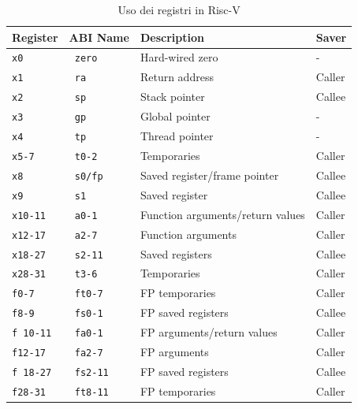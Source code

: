 \begin{table}[H]
	\begin{center}
		\begin{tabular}{|l|l|l|l|}
			\hline
			Register       & ABI Name       & Description                      & Saver  \\
			\hline
			\verb|x0|      & \verb| zero|   & Hard-wired zero                  & -      \\
			\verb|x1|      & \verb| ra|     & Return address                   & Caller \\
			\verb|x2|      & \verb| sp|     & Stack pointer                    & Callee \\
			\verb|x3|      & \verb| gp|     & Global pointer                   & -      \\
			\verb|x4|      & \verb| tp|     & Thread pointer                   & -      \\
			\verb|x5-7|    & \verb| t0-2|   & Temporaries                      & Caller \\
			\verb|x8|      & \verb| s0/fp|  & Saved register/frame pointer     & Callee \\
			\verb|x9|      & \verb| s1|     & Saved register                   & Callee \\
			\verb|x10-11|  & \verb| a0-1|   & Function arguments/return values & Caller \\
			\verb|x12-17|  & \verb| a2-7|   & Function arguments               & Caller \\
			\verb|x18-27|  & \verb| s2-11|  & Saved registers                  & Callee \\
			\verb|x28-31|  & \verb| t3-6|   & Temporaries                      & Caller \\
			\hline
			\verb|f0-7|    & \verb| ft0-7|  & FP temporaries                   & Caller \\
			\verb|f8-9|    & \verb| fs0-1|  & FP saved registers               & Callee \\
			\verb|f 10-11| & \verb| fa0-1|  & FP arguments/return values       & Caller \\
			\verb|f12-17|  & \verb| fa2-7|  & FP arguments                     & Caller \\
			\verb|f 18-27| & \verb| fs2-11| & FP saved registers               & Callee \\
			\verb|f28-31|  & \verb| ft8-11| & FP temporaries                   & Caller \\
			\hline
		\end{tabular}
	\end{center}
	\caption{Uso dei registri in Risc-V}
\end{table}
